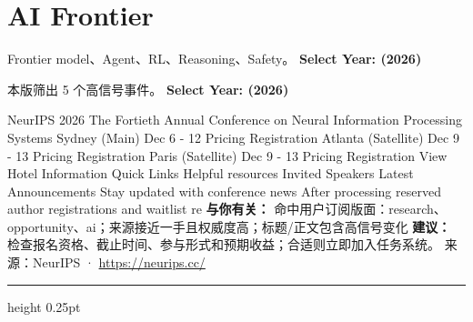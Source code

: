 \documentclass[10.5pt]{ctexart}
\begin{document}
\section*{AI Frontier}
{\color{ormuted} Frontier model、Agent、RL、Reasoning、Safety。}
\vspace{2mm}
{\LARGE\bfseries Select Year: (2026)}\par
\vspace{1mm}
{\color{ormuted} 本版筛出 5 个高信号事件。}
\vspace{3mm}
{\Large\bfseries Select Year: (2026)}\par
NeurIPS 2026 The Fortieth Annual Conference on Neural Information Processing Systems Sydney (Main) Dec 6 - 12 Pricing Registration Atlanta (Satellite) Dec 9 - 13 Pricing Registration Paris (Satellite) Dec 9 - 13 Pricing Registration View Hotel Information Quick Links Helpful resources Invited Speakers Latest Announcements Stay updated with conference news After processing reserved author registrations and waitlist re
\textbf{与你有关：} 命中用户订阅版面：research、opportunity、ai；来源接近一手且权威度高；标题/正文包含高信号变化
\textbf{建议：} 检查报名资格、截止时间、参与形式和预期收益；合适则立即加入任务系统。
{\footnotesize\color{ormuted} 来源：NeurIPS · \url{https://neurips.cc/}}
\vspace{4mm}
\hrule height 0.25pt
\vspace{3mm}
\end{document}
